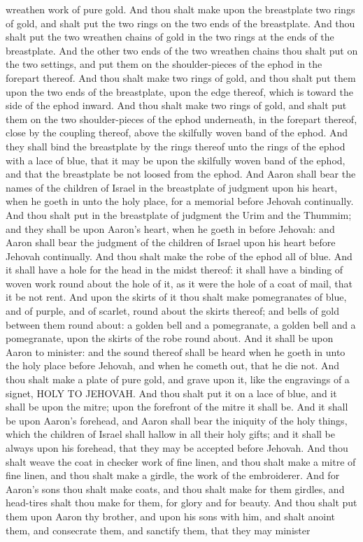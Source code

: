 wreathen work of pure gold. And thou shalt make upon the breastplate two rings of gold, and shalt put the two rings on the two ends of the breastplate. And thou shalt put the two wreathen chains of gold in the two rings at the ends of the breastplate. And the other two ends of the two wreathen chains thou shalt put on the two settings, and put them on the shoulder-pieces of the ephod in the forepart thereof. And thou shalt make two rings of gold, and thou shalt put them upon the two ends of the breastplate, upon the edge thereof, which is toward the side of the ephod inward. And thou shalt make two rings of gold, and shalt put them on the two shoulder-pieces of the ephod underneath, in the forepart thereof, close by the coupling thereof, above the skilfully woven band of the ephod. And they shall bind the breastplate by the rings thereof unto the rings of the ephod with a lace of blue, that it may be upon the skilfully woven band of the ephod, and that the breastplate be not loosed from the ephod. And Aaron shall bear the names of the children of Israel in the breastplate of judgment upon his heart, when he goeth in unto the holy place, for a memorial before Jehovah continually. And thou shalt put in the breastplate of judgment the Urim and the Thummim; and they shall be upon Aaron’s heart, when he goeth in before Jehovah: and Aaron shall bear the judgment of the children of Israel upon his heart before Jehovah continually.  And thou shalt make the robe of the ephod all of blue. And it shall have a hole for the head in the midst thereof: it shall have a binding of woven work round about the hole of it, as it were the hole of a coat of mail, that it be not rent. And upon the skirts of it thou shalt make pomegranates of blue, and of purple, and of scarlet, round about the skirts thereof; and bells of gold between them round about: a golden bell and a pomegranate, a golden bell and a pomegranate, upon the skirts of the robe round about. And it shall be upon Aaron to minister: and the sound thereof shall be heard when he goeth in unto the holy place before Jehovah, and when he cometh out, that he die not.  And thou shalt make a plate of pure gold, and grave upon it, like the engravings of a signet, HOLY TO JEHOVAH. And thou shalt put it on a lace of blue, and it shall be upon the mitre; upon the forefront of the mitre it shall be. And it shall be upon Aaron’s forehead, and Aaron shall bear the iniquity of the holy things, which the children of Israel shall hallow in all their holy gifts; and it shall be always upon his forehead, that they may be accepted before Jehovah. And thou shalt weave the coat in checker work of fine linen, and thou shalt make a mitre of fine linen, and thou shalt make a girdle, the work of the embroiderer.  And for Aaron’s sons thou shalt make coats, and thou shalt make for them girdles, and head-tires shalt thou make for them, for glory and for beauty. And thou shalt put them upon Aaron thy brother, and upon his sons with him, and shalt anoint them, and consecrate them, and sanctify them, that they may minister 